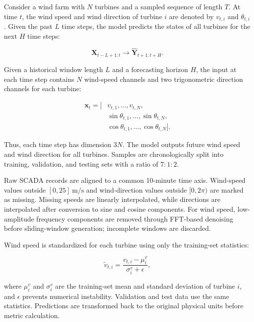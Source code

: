 Consider a wind farm with $N$ turbines and a sampled sequence of length $T$. At time $t$, the wind speed and wind direction of turbine $i$ are denoted by $v_{t,i}$ and $\theta_{t,i}$. Given the past $L$ time steps, the model predicts the states of all turbines for the next $H$ time steps:

\begin{equation}
\mathbf{X}_{t-L+1:t} \longrightarrow \hat{\mathbf{Y}}_{t+1:t+H}.
\end{equation}

Given a historical window length $L$ and a forecasting horizon $H$, the input at each time step contains $N$ wind-speed channels and two trigonometric direction channels for each turbine:

\begin{equation}
\begin{aligned}
\mathbf{x}_t = [&v_{t,1}, \ldots, v_{t,N},\\
&\sin\theta_{t,1}, \ldots, \sin\theta_{t,N},\\
&\cos\theta_{t,1}, \ldots, \cos\theta_{t,N} ] .
\end{aligned}
\end{equation}

Thus, each time step has dimension $3N$. The model outputs future wind speed and wind direction for all turbines. Samples are chronologically split into training, validation, and testing sets with a ratio of $7:1:2$.

Raw SCADA records are aligned to a common 10-minute time axis. Wind-speed values outside $[0,25]\ \mathrm{m/s}$ and wind-direction values outside $[0,2\pi)$ are marked as missing. Missing speeds are linearly interpolated, while directions are interpolated after conversion to sine and cosine components. For wind speed, low-amplitude frequency components are removed through FFT-based denoising before sliding-window generation; incomplete windows are discarded.

Wind speed is standardized for each turbine using only the training-set statistics:

\begin{equation}
\tilde{v}_{t,i} = \frac{v_{t,i}-\mu_i^v}{\sigma_i^v+\epsilon},
\end{equation}

where $\mu_i^v$ and $\sigma_i^v$ are the training-set mean and standard deviation of turbine $i$, and $\epsilon$ prevents numerical instability. Validation and test data use the same statistics. Predictions are transformed back to the original physical units before metric calculation.

